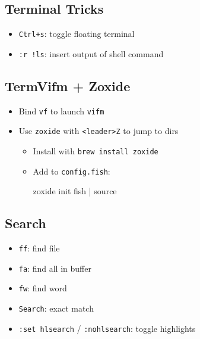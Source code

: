 \documentclass[
  letterpaper,
  DIV=11,
  numbers=noendperiod]{scrartcl}
\newenvironment{Shaded}{}{}
\newcommand{\NormalTok}[1]{\textcolor[rgb]{0.22,0.23,0.26}{#1}}
\providecommand{\tightlist}{%
  \setlength{\itemsep}{0pt}\setlength{\parskip}{0pt}}\usepackage{longtable,booktabs,array}
\begin{document}
\subsection{Terminal Tricks}\label{terminal-tricks}

\begin{itemize}
\tightlist
\item
  \texttt{Ctrl+s}: toggle floating terminal
\item
  \texttt{:r\ !ls}: insert output of shell command
\end{itemize}

\subsection{TermVifm + Zoxide}\label{termvifm-zoxide}

\begin{itemize}
\item
  Bind \texttt{vf} to launch \texttt{vifm}
\item
  Use \texttt{zoxide} with \texttt{\textless{}leader\textgreater{}Z} to
  jump to dirs

  \begin{itemize}
  \item
    Install with \texttt{brew\ install\ zoxide}
  \item
    Add to \texttt{config.fish}:

\begin{Shaded}
\begin{Highlighting}[]
\NormalTok{zoxide init fish | source}
\end{Highlighting}
\end{Shaded}
  \end{itemize}
\end{itemize}

\subsection{Search}\label{search}

\begin{itemize}
\tightlist
\item
  \texttt{ff}: find file
\item
  \texttt{fa}: find all in buffer
\item
  \texttt{fw}: find word
\item
  \texttt{\textquotesingle{}Search}: exact match
\item
  \texttt{:set\ hlsearch} / \texttt{:nohlsearch}: toggle highlights
\end{itemize}
\end{document}
